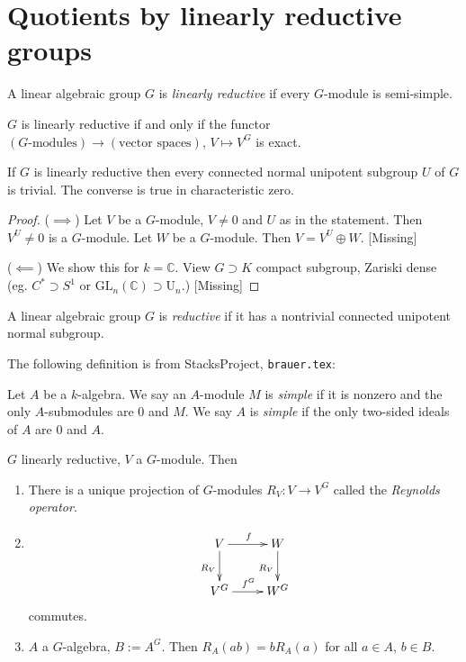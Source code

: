 \section{Quotients by linearly reductive
groups}
\label{git-label-007}

\begin{definition}
\label{definition-linearly-reductive-group}
A linear algebraic group $G$ is {\it linearly
reductive} if every $G$-module is
semi-simple.
\end{definition}

\begin{exercise}
\label{git-label-008}
$G$ is linearly reductive if and only if the
functor $(\text{$G$-modules})\to(\text{vector
spaces})$, $V \mapsto V^G$ is exact.
\end{exercise}

\begin{theorem}
\label{git-label-009}
If $G$ is linearly reductive then every
connected normal unipotent subgroup $U$ of
$G$ is trivial. The converse is true in
characteristic zero.
\end{theorem}

\begin{proof}
($\implies$) Let $V$ be a $G$-module, $V\neq
0$ and $U$ as in the statement. Then $V^U\neq
0$ is a $G$-module. Let $W$ be a $G$-module.
Then $V=V^U \oplus W$. [Missing]

($\impliedby$) We show this for $k=
\mathbb{C}$. View $G \supset K$ compact
subgroup, Zariski dense (eg. $C^* \supset
S^1$ or $\text{GL}_n(\mathbb{C})\supset
\text{U}_n$.) [Missing]
\end{proof}

\begin{definition}
\label{git-label-010}
A linear algebraic group $G$ is {\it
reductive} if it has a nontrivial connected
unipotent normal subgroup.
\end{definition}

The following definition is from
StacksProject, \texttt{brauer.tex}:

\begin{definition}
\label{definition-simple}
Let $A$ be a $k$-algebra. We say an
$A$-module $M$ is {\it simple} if it is
nonzero and the only $A$-submodules are $0$
and $M$. We say $A$ is {\it simple} if the
only two-sided ideals of $A$ are $0$ and $A$.
\end{definition}

\begin{lemma}
\label{lemma-Reynolds-operator}
$G$ linearly reductive, $V$ a $G$-module.
Then
\begin{enumerate}
\item There is a unique projection of
$G$-modules $R_V:V \to V^G$ called the
{\it Reynolds operator}.
\item
$$
\xymatrix{
V\ar[d]_{R_V}\ar[r]^f&  W\ar[d]_{R_V}\\
V^G\ar[r]^{f^G}&W^G
}
$$
commutes.
\item $A$ a $G$-algebra, $B:=A^G$. Then
$R_A(ab)=bR_A(a)$ for all $a \in A$, $b
\in B$.
\end{enumerate}
\end{lemma}

